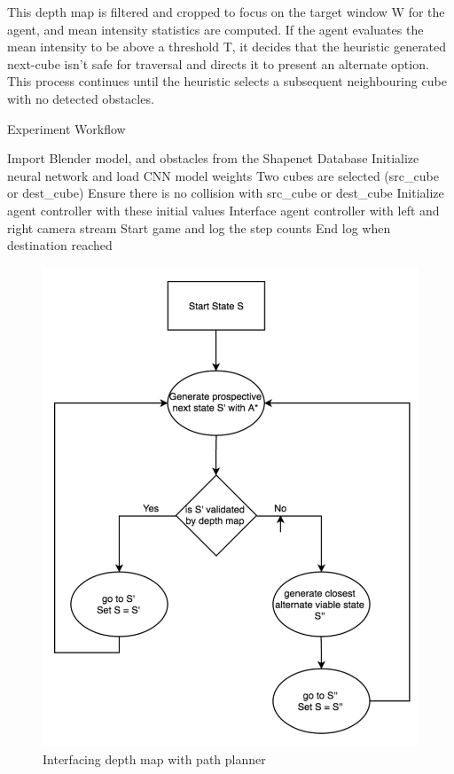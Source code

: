 This depth map is filtered and cropped to focus on the target window W for the agent, and mean intensity statistics are computed. If the agent evaluates the mean intensity to be above a threshold T, it decides that the heuristic generated next-cube isn't safe for traversal and directs it to present an alternate option. This process continues until the heuristic selects a subsequent neighbouring cube with no detected obstacles.

\begin{algorithm}
\caption{Experiment Workflow}
\label{alg1}
\begin{algorithmic}[1]
\STATE Import Blender model, and obstacles from the Shapenet Database
\STATE Initialize neural network and load CNN model weights
\STATE Two cubes are selected (src\_cube or dest\_cube)
\STATE Ensure there is no collision with src\_cube or dest\_cube
\STATE Initialize agent controller with these initial values
\STATE Interface agent controller with left and right camera stream
\STATE Start game and log the step counts
\STATE End log when destination reached
\end{algorithmic}
\end{algorithm}

\begin{figure}
  \includegraphics[width=\linewidth]{images/flowchart.png}
  \caption{Interfacing depth map with path planner}
  \label{fig:flowchart1}
\end{figure}